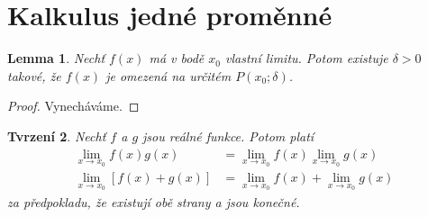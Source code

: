 \documentclass[a4paper,11pt]{article}
\newtheorem{theorem}{Tvrzení}[section]
\newtheorem{lemma}[theorem]{Lemma}
\theoremstyle{remark}
\theoremstyle{definition}
\begin{document}
	
	\section{Kalkulus jedné proměnné}
	
		\begin{lemma}
			Nechť $f(x)$ má v bodě $x_0$ vlastní limitu. Potom existuje $\delta>0$ takové, že $f(x)$ je omezená na určitém $P(x_0;\delta)$.
		\end{lemma}
		\begin{proof}
			Vynecháváme.
		\end{proof}
		
		\begin{theorem}
			Nechť $f$ a $g$ jsou reálné funkce. Potom platí
			\begin{align}
				\lim_{x\to x_0} f(x)g(x) &= \lim_{x\to x_0} f(x) \lim_{x\to x_0} g(x)
			\\
				\lim_{x\to x_0} [f(x) + g(x)] &= \lim_{x\to x_0} f(x) + \lim_{x\to x_0} g(x)
			\end{align}
			za předpokladu, že existují obě strany a jsou konečné.
		\end{theorem}
\end{document}
